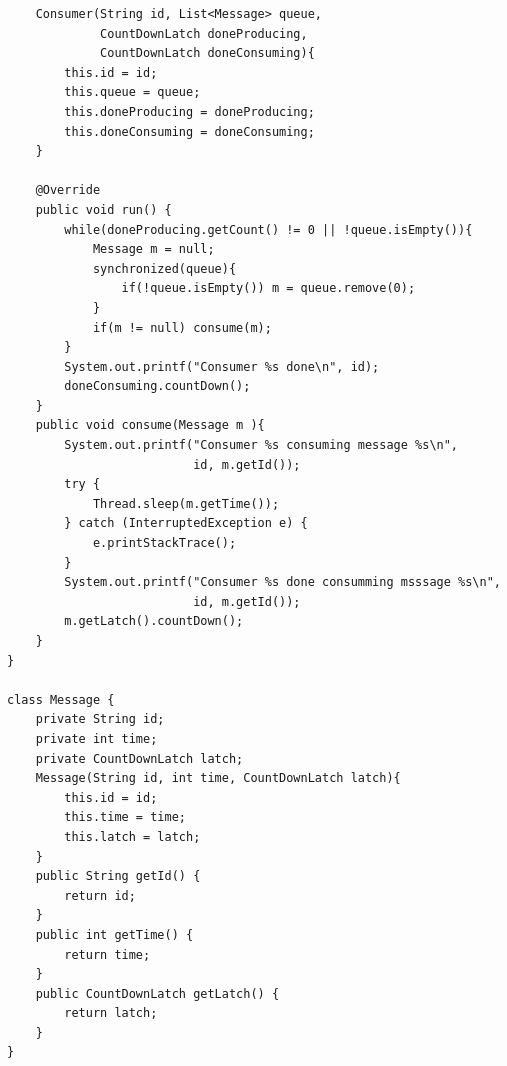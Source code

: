\documentclass{latex/classes/thesis}
\begin{document}
\begin{lstlisting}
    Consumer(String id, List<Message> queue,
             CountDownLatch doneProducing,
             CountDownLatch doneConsuming){
        this.id = id;
        this.queue = queue;
        this.doneProducing = doneProducing;
        this.doneConsuming = doneConsuming;
    }

    @Override
    public void run() {
        while(doneProducing.getCount() != 0 || !queue.isEmpty()){
            Message m = null;
            synchronized(queue){
                if(!queue.isEmpty()) m = queue.remove(0);
            }
            if(m != null) consume(m);
        }
        System.out.printf("Consumer %s done\n", id);
        doneConsuming.countDown();
    }
    public void consume(Message m ){
        System.out.printf("Consumer %s consuming message %s\n",
                          id, m.getId());
        try {
            Thread.sleep(m.getTime());
        } catch (InterruptedException e) {
            e.printStackTrace();
        }
        System.out.printf("Consumer %s done consumming msssage %s\n",
                          id, m.getId());
        m.getLatch().countDown();
    }
}

class Message {
    private String id;
    private int time;
    private CountDownLatch latch;
    Message(String id, int time, CountDownLatch latch){
        this.id = id;
        this.time = time;
        this.latch = latch;
    }
    public String getId() {
        return id;
    }
    public int getTime() {
        return time;
    }
    public CountDownLatch getLatch() {
        return latch;
    }
}

\end{lstlisting}
\end{document}
